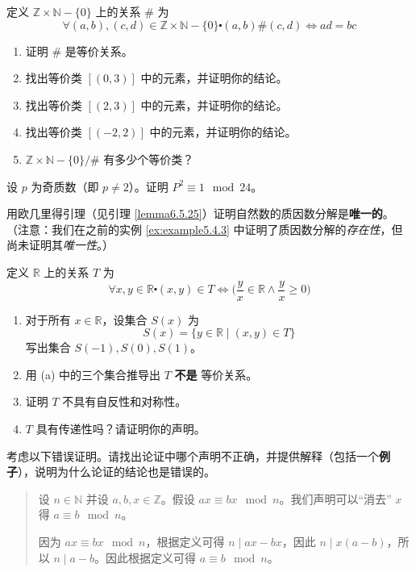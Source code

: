 \begin{exercise}
    定义 $\mathbb{Z} \times \mathbb{N} - \{0\}$ 上的关系 $\#$ 为
    \[\forall (a, b),(c, d) \in \mathbb{Z} \times \mathbb{N} - \{0\} \centerdot (a, b) \# (c, d) \iff ad = bc\]
    \begin{enumerate}[label=(\alph*)]
        \item 证明 $\#$ 是等价关系。
        \item 找出等价类 $[(0, 3)]$ 中的元素，并证明你的结论。
        \item 找出等价类 $[(2, 3)]$ 中的元素，并证明你的结论。
        \item 找出等价类 $[(-2, 2)]$ 中的元素，并证明你的结论。
        \item $\mathbb{Z} \times \mathbb{N} - \{0\} / \#$ 有多少个等价类？
    \end{enumerate}
\end{exercise}

\begin{exercise}
    设 $p$ 为奇质数（即 $p \ne 2$）。证明 $P^2 \equiv 1 \mod 24$。
\end{exercise}

\begin{exercise}
    用欧几里得引理（见引理 \ref{lemma6.5.25}）证明自然数的质因数分解是\textbf{唯一的}。\\
    （注意：我们在之前的实例 \ref{ex:example5.4.3} 中证明了质因数分解的\emph{存在性}，但尚未证明其\emph{唯一性}。）
\end{exercise}

\begin{exercise}
    定义 $\mathbb{R}$ 上的关系 $T$ 为
    \[\forall x, y \in \mathbb{R} \centerdot (x, y) \in T \iff \Big(\frac{y}{x} \in \mathbb{R} \land \frac{y}{x} \ge 0 \Big)\]
    \begin{enumerate}[label=(\alph*)]
        \item 对于所有 $x \in \mathbb{R}$，设集合 $S(x)$ 为
            \[S(x) = \{y \in \mathbb{R} \mid (x, y) \in T\}\]
            写出集合 $S(-1), S(0), S(1)$。
        \item 用 (a) 中的三个集合推导出 $T$ \textbf{不是} 等价关系。
        \item 证明 $T$ 不具有自反性和对称性。
        \item $T$ 具有传递性吗？请证明你的声明。
    \end{enumerate}
\end{exercise}

\begin{exercise}
    考虑以下错误证明。请找出论证中哪个声明不正确，并提供解释（包括一个\textbf{例子}），说明为什么论证的结论也是错误的。
    \begin{quote}
        设 $n \in \mathbb{N}$ 并设 $a,b,x \in \mathbb{Z}$。假设 $ax \equiv bx \mod n$。我们声明可以``消去'' $x$ 得 $a \equiv b \mod n$。

        因为 $ax \equiv bx \mod n$，根据定义可得 $n \mid ax-bx$，因此 $n \mid x(a-b)$，所以 $n \mid a-b$。因此根据定义可得 $a \equiv b \mod n$。
    \end{quote}
\end{exercise}

